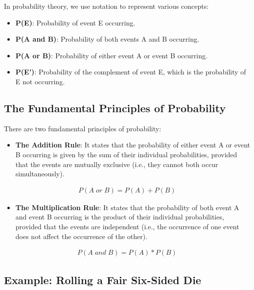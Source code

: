 \documentclass[
  a4paper,
]{scrbook}
\providecommand{\tightlist}{%
  \setlength{\itemsep}{0pt}\setlength{\parskip}{0pt}}\usepackage{longtable,booktabs,array}
\begin{document}
In probability theory, we use notation to represent various concepts:

\begin{itemize}
\tightlist
\item
  \textbf{P(E)}: Probability of event E occurring.
\item
  \textbf{P(A and B)}: Probability of both events A and B occurring.
\item
  \textbf{P(A or B)}: Probability of either event A or event B
  occurring.
\item
  \textbf{P(E')}: Probability of the complement of event E, which is the
  probability of E not occurring.
\end{itemize}

\subsection{The Fundamental Principles of
Probability}\label{the-fundamental-principles-of-probability}

There are two fundamental principles of probability:

\begin{itemize}
\tightlist
\item
  \textbf{The Addition Rule}: It states that the probability of either
  event A or event B occurring is given by the sum of their individual
  probabilities, provided that the events are mutually exclusive (i.e.,
  they cannot both occur simultaneously).
\end{itemize}

\begin{align}
P(A \; or \; B) = P(A) + P(B)
\end{align}

\begin{itemize}
\tightlist
\item
  \textbf{The Multiplication Rule}: It states that the probability of
  both event A and event B occurring is the product of their individual
  probabilities, provided that the events are independent (i.e., the
  occurrence of one event does not affect the occurrence of the other).
\end{itemize}

\begin{align}
P(A \; and\;B) = P(A) * P(B)
\end{align}

\subsection{Example: Rolling a Fair Six-Sided
Die}\label{example-rolling-a-fair-six-sided-die}
\end{document}
